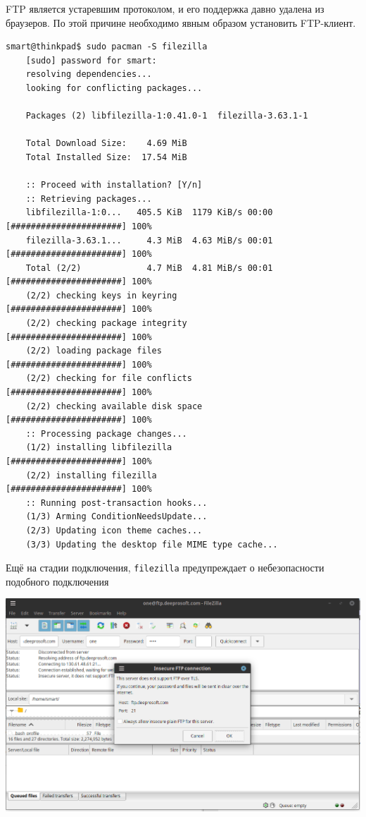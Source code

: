 FTP является устаревшим протоколом, и его поддержка давно удалена из браузеров. По этой причине необходимо явным образом установить FTP-клиент.
\begin{Verbatim}[frame=single]
    smart@thinkpad$ sudo pacman -S filezilla
    [sudo] password for smart: 
    resolving dependencies...
    looking for conflicting packages...

    Packages (2) libfilezilla-1:0.41.0-1  filezilla-3.63.1-1

    Total Download Size:    4.69 MiB
    Total Installed Size:  17.54 MiB

    :: Proceed with installation? [Y/n] 
    :: Retrieving packages...
    libfilezilla-1:0...   405.5 KiB  1179 KiB/s 00:00 [######################] 100%
    filezilla-3.63.1...     4.3 MiB  4.63 MiB/s 00:01 [######################] 100%
    Total (2/2)             4.7 MiB  4.81 MiB/s 00:01 [######################] 100%
    (2/2) checking keys in keyring                     [######################] 100%
    (2/2) checking package integrity                   [######################] 100%
    (2/2) loading package files                        [######################] 100%
    (2/2) checking for file conflicts                  [######################] 100%
    (2/2) checking available disk space                [######################] 100%
    :: Processing package changes...
    (1/2) installing libfilezilla                      [######################] 100%
    (2/2) installing filezilla                         [######################] 100%
    :: Running post-transaction hooks...
    (1/3) Arming ConditionNeedsUpdate...
    (2/3) Updating icon theme caches...
    (3/3) Updating the desktop file MIME type cache...
\end{Verbatim}

Ещё на стадии подключения, \texttt{filezilla} предупреждает о небезопасности подобного подключения
\begin{center}
    \includegraphics[scale=0.5]{res/5.filezilla-warning.png}
\end{center}

